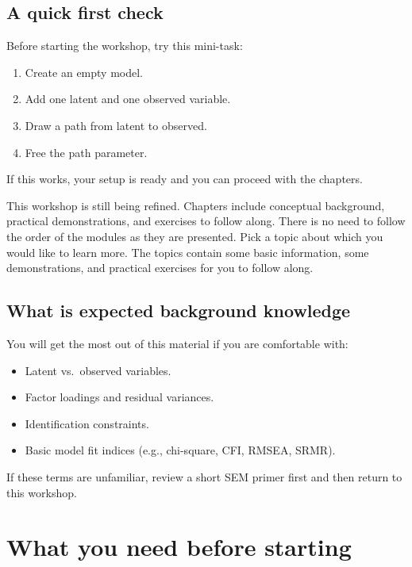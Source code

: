 \documentclass[
  letterpaper,
  DIV=11,
  numbers=noendperiod]{scrreprt}
\providecommand{\tightlist}{%
  \setlength{\itemsep}{0pt}\setlength{\parskip}{0pt}}\usepackage{longtable,booktabs,array}
\begin{document}
\section{A quick first check}\label{a-quick-first-check}

Before starting the workshop, try this mini-task:

\begin{enumerate}
\def\labelenumi{\arabic{enumi}.}
\tightlist
\item
  Create an empty model.
\item
  Add one latent and one observed variable.
\item
  Draw a path from latent to observed.
\item
  Free the path parameter.
\end{enumerate}

If this works, your setup is ready and you can proceed with the
chapters.

This workshop is still being refined. Chapters include conceptual
background, practical demonstrations, and exercises to follow along.
There is no need to follow the order of the modules as they are
presented. Pick a topic about which you would like to learn more. The
topics contain some basic information, some demonstrations, and
practical exercises for you to follow along.

\section{What is expected background
knowledge}\label{what-is-expected-background-knowledge}

You will get the most out of this material if you are comfortable with:

\begin{itemize}
\tightlist
\item
  Latent vs.~observed variables.
\item
  Factor loadings and residual variances.
\item
  Identification constraints.
\item
  Basic model fit indices (e.g., chi-square, CFI, RMSEA, SRMR).
\end{itemize}

If these terms are unfamiliar, review a short SEM primer first and then
return to this workshop.


\chapter{What you need before
starting}\label{what-you-need-before-starting}
\end{document}
